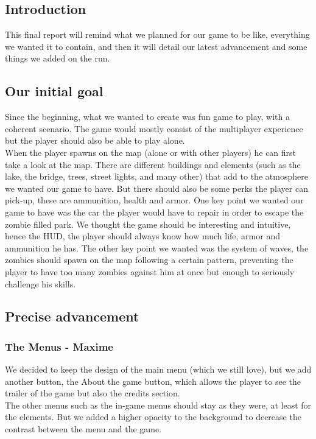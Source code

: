 \documentclass[12pt]{article}
\begin{document}
	\subsection{Introduction}

	This final report will remind what we planned for our game to be like, everything we wanted it to contain, and then it will detail our latest advancement and some things we added on the run.
    
    \subsection{Our initial goal}

	Since the beginning, what we wanted to create was fun game to play, with a \guillemotleft \space coherent \guillemotright \space scenario. The game would mostly consist of the multiplayer experience but the player should also be able to play alone.\\
    When the player spawns on the map (alone or with other players) he can first take a look at the map. There are different buildings and elements (such as the lake, the bridge, trees, street lights, and many other) that add to the atmosphere we wanted our game to have. But there should also be some perks the player can pick-up, these are ammunition, health and armor. One key point we wanted our game to have was the car the player would have to  repair in order to escape the zombie filled park. We thought the game should be interesting and intuitive, hence the HUD, the player should always know how much life, armor and ammunition he has. The other key point we wanted was the system of waves, the zombies should spawn on the map following a certain pattern, preventing the player to have too many zombies against him at once but enough to seriously challenge his skills.
    
    \subsection{Precise advancement}
    	
        \subsubsection{The Menus - Maxime}
        
        We decided to keep the design of the main menu (which we still love), but we add another button, the \guillemotleft \space About the game \guillemotright \space button, which allows the player to see the trailer of the game but also the credits section.\\
        The other menus such as the in-game menus should stay as they were, at least for the elements. But we added a higher opacity to the background to decrease the contrast between the menu and the game.\\
        
\end{document}

